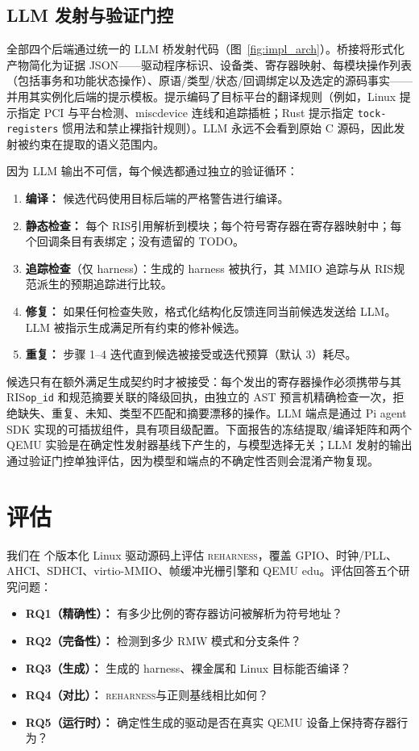 \documentclass[sigplan, screen, review, anonymous]{acmart}
\newcommand{\reharness}{\textsc{reharness}}
\newcommand{\rislang}{RIS}
\begin{document}
\subsection{LLM 发射与验证门控}

全部四个后端通过统一的 LLM 桥发射代码（图~\ref{fig:impl_arch}）。桥接将形式化产物简化为证据 JSON——驱动程序标识、设备类、寄存器映射、每模块操作列表（包括事务和功能状态操作）、原语/类型/状态/回调绑定以及选定的源码事实——并用其实例化后端的提示模板。提示编码了目标平台的翻译规则（例如，Linux 提示指定 PCI 与平台检测、miscdevice 连线和追踪插桩；Rust 提示指定 \texttt{tock-registers} 惯用法和禁止裸指针规则）。LLM 永远不会看到原始 C 源码，因此发射被约束在提取的语义范围内。

因为 LLM 输出不可信，每个候选都通过独立的验证循环：

\begin{enumerate}
\item \textbf{编译：} 候选代码使用目标后端的严格警告进行编译。
\item \textbf{静态检查：} 每个 \rislang 引用解析到模块；每个符号寄存器在寄存器映射中；每个回调条目有表绑定；没有遗留的 TODO。
\item \textbf{追踪检查}（仅 harness）：生成的 harness 被执行，其 MMIO 追踪与从 \rislang 规范派生的预期追踪进行比较。
\item \textbf{修复：} 如果任何检查失败，格式化结构化反馈连同当前候选发送给 LLM。LLM 被指示生成满足所有约束的修补候选。
\item \textbf{重复：} 步骤 1--4 迭代直到候选被接受或迭代预算（默认 3）耗尽。
\end{enumerate}

候选只有在额外满足生成契约时才被接受：每个发出的寄存器操作必须携带与其 \rislang \texttt{op\_id} 和规范摘要关联的降级回执，由独立的 AST 预言机精确检查一次，拒绝缺失、重复、未知、类型不匹配和摘要漂移的操作。LLM 端点是通过 Pi agent SDK 实现的可插拔组件，具有项目级配置。下面报告的冻结提取/编译矩阵和两个 QEMU 实验是在确定性发射器基线下产生的，与模型选择无关；LLM 发射的输出通过验证门控单独评估，因为模型和端点的不确定性否则会混淆产物复现。

\section{评估}

我们在 \EvalDrivers{} 个版本化 Linux 驱动源码上评估 \reharness，覆盖 GPIO、时钟/PLL、AHCI、SDHCI、virtio-MMIO、帧缓冲光栅引擎和 QEMU edu。评估回答五个研究问题：

\begin{itemize}
\item \textbf{RQ1（精确性）：} 有多少比例的寄存器访问被解析为符号地址？
\item \textbf{RQ2（完备性）：} 检测到多少 RMW 模式和分支条件？
\item \textbf{RQ3（生成）：} 生成的 harness、裸金属和 Linux 目标能否编译？
\item \textbf{RQ4（对比）：} \reharness 与正则基线相比如何？
\item \textbf{RQ5（运行时）：} 确定性生成的驱动是否在真实 QEMU 设备上保持寄存器行为？
\end{itemize}
\end{document}

